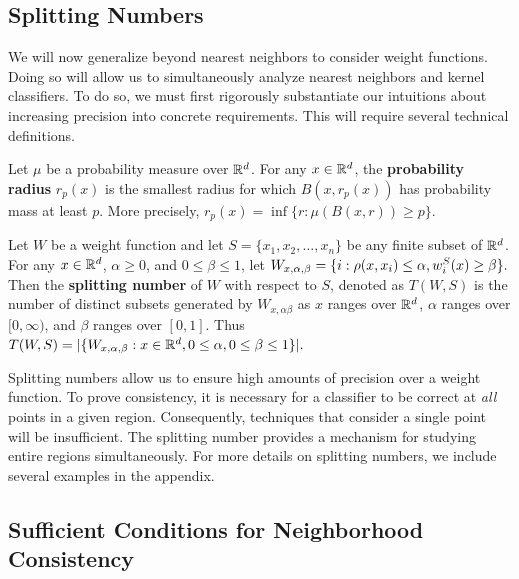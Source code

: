 \subsection{Splitting Numbers}

We will now generalize beyond nearest neighbors to consider weight functions. Doing so will allow us to simultaneously analyze nearest neighbors and kernel classifiers. To do so, we must first rigorously substantiate our intuitions about increasing precision into concrete requirements. This will require several technical definitions.

\begin{defn}\label{defn:prob_radius}
Let $\mu$ be a probability measure over $\mathbb R^d$. For any $x \in \mathbb R^d$, the \textbf{probability radius} $r_p(x)$ is the smallest radius for which $B(x, r_p(x))$ has probability mass at least $p$. More precisely, $r_p(x) = \inf\{r: \mu(B(x,r)) \geq p\}.$ 
\end{defn}

\begin{defn}\label{defn:splitting_number}
Let $W$ be a weight function and let $S = \{x_1, x_2, \dots, x_n\}$ be any finite subset of $\mathbb R^d$. For any $x \in \mathbb R^d$, $\alpha \geq 0$, and $0 \leq \beta \leq 1$, let $W_{x, \alpha, \beta}  = \{i: \rho(x, x_i) \leq \alpha, w_i^S(x) \geq \beta\}.$ Then the \textbf{splitting number} of $W$ with respect to $S$, denoted as $T(W, S)$ is the number of distinct subsets generated by $W_{x, \alpha \beta}$ as $x$ ranges over $\mathbb R^d$, $\alpha$ ranges over $[0, \infty)$, and $\beta$ ranges over $[0,1]$. Thus $T(W, S) = |\{W_{x, \alpha, \beta}: x \in \mathbb R^d, 0 \leq \alpha, 0 \leq \beta \leq 1\}|.$
\end{defn}

Splitting numbers allow us to ensure high amounts of precision over a weight function. To prove \ncons\emph{ }consistency, it is necessary for a classifier to be correct at \textit{all} points in a given region. Consequently, techniques that consider a single point will be insufficient. The splitting number provides a mechanism for studying entire regions simultaneously. For more details on splitting numbers, we include several examples in the appendix.

\subsection{Sufficient Conditions for Neighborhood Consistency}

